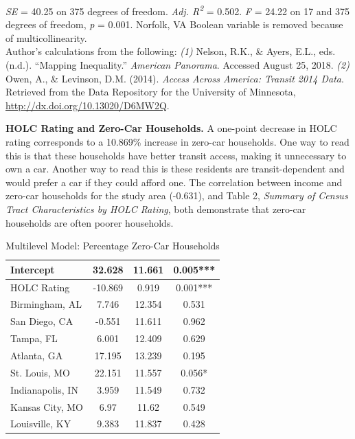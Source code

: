\documentclass[paper=letter, fontsize=12pt]{scrartcl} %
\begin{document}
\begin{table}
\textit{SE} = 40.25 on 375 degrees of freedom. \textit{Adj. R\textsuperscript{2}} = 0.502. \textit{F} = 24.22 on 17 and 375 degrees of freedom, \textit{p} = 0.001. Norfolk, VA Boolean variable is removed because of multicollinearity.\\
Author's calculations from the following: \textit{(1)} Nelson, R.K., \& Ayers, E.L., eds. (n.d.). ``Mapping Inequality.'' \textit{American Panorama}. Accessed August 25, 2018. \textit{(2)} Owen, A., \& Levinson, D.M. (2014). \textit{Access Across America: Transit 2014 Data}. Retrieved from the Data Repository for the University of Minnesota, \href{http://dx.doi.org/10.13020/D6MW2Q}{http://dx.doi.org/10.13020/D6MW2Q}.
\end{table}

\begin{table}
	\textbf{HOLC Rating and Zero-Car Households.} A one-point decrease in HOLC rating corresponds to a 10.869\% increase in zero-car households. One way to read this is that these households have better transit access, making it unnecessary to own a car. Another way to read this is these residents are transit-dependent and would prefer a car if they could afford one. The correlation between income and zero-car households for the study area (-0.631), and Table 2, \textit{Summary of Census Tract Characteristics by HOLC Rating}, both demonstrate that zero-car households are often poorer households.
	\caption{Multilevel Model: Percentage Zero-Car Households}
	\begin{center}
		\begin{tabular}{|| l | c c c ||}
			\hline
			Intercept & 32.628 & 11.661 & 0.005***\\ 
			\hline 
			HOLC Rating & -10.869 & 0.919 & 0.001***\\ 
			\hline 
			Birmingham, AL & 7.746 & 12.354 & 0.531\\ 
			\hline 
			San Diego, CA & -0.551 & 11.611 & 0.962\\ 
			\hline 
			Tampa, FL & 6.001 & 12.409 & 0.629\\ 
			\hline 
			Atlanta, GA & 17.195 & 13.239 & 0.195\\ 
			\hline 
			St. Louis, MO & 22.151 & 11.557 & 0.056*\\ 
			\hline 
			Indianapolis, IN & 3.959 & 11.549 & 0.732\\ 
			\hline 
			Kansas City, MO & 6.97 & 11.62 & 0.549\\ 
			\hline 
			Louisville, KY & 9.383 & 11.837 & 0.428\\ 
			\hline 

\end{tabular}
\end{center}
\end{table}
\end{document}
